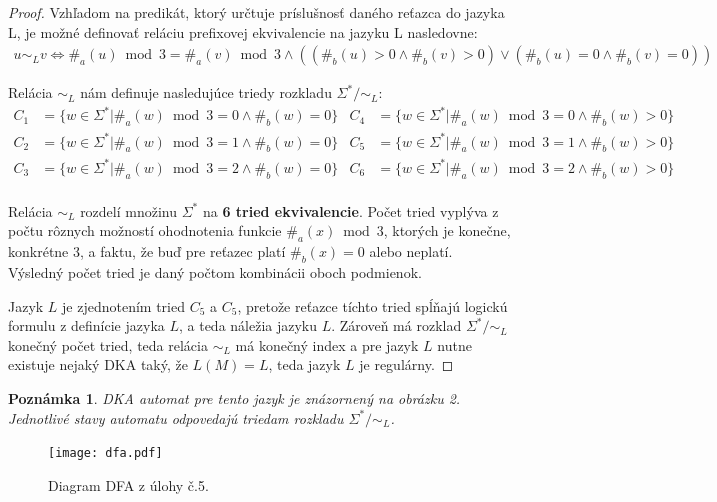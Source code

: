 \documentclass[10pt]{article}
\begin{document}
\begin{proof}
Vzhľadom na predikát, ktorý určtuje príslušnosť daného reťazca do jazyka L, je možné definovať
    reláciu prefixovej ekvivalencie na jazyku L nasledovne:
\begin{align*}
u \sim_L v \iff \#_a(u)\bmod 3 = \#_a(v)\bmod 3 \land ((\#_b(u) > 0 \land \#_b(v) > 0) \lor (\#_b(u) = 0 \land
\#_b(v) = 0))
\end{align*}

Relácia $\sim_L$ nám definuje nasledujúce triedy rozkladu $\Sigma^* / \sim_L$:
\begin{align*}
    C_1 &= \{ w \in \Sigma^* | \#_a(w) \bmod 3 = 0 \land \#_b(w) = 0 \} & C_4 &= \{ w \in \Sigma^* | \#_a(w) \bmod 3 = 0 \land \#_b(w) > 0 \} \\
    C_2 &= \{ w \in \Sigma^* | \#_a(w) \bmod 3 = 1 \land \#_b(w) = 0 \} & C_5 &= \{ w \in \Sigma^* | \#_a(w) \bmod 3 = 1 \land \#_b(w) > 0 \} \\
    C_3 &= \{ w \in \Sigma^* | \#_a(w) \bmod 3 = 2 \land \#_b(w) = 0 \} & C_6 &= \{ w \in \Sigma^* | \#_a(w) \bmod 3 = 2 \land \#_b(w) > 0 \} \\
\end{align*}

Relácia $\sim_L$ rozdelí množinu $\Sigma^*$ na \textbf{6 tried ekvivalencie}. Počet tried vyplýva z
    počtu rôznych možností ohodnotenia funkcie $\#_a(x) \bmod 3$, ktorých je konečne, konkrétne 3, a faktu, že buď pre reťazec
    platí $\#_b(x) = 0$ alebo neplatí. Výsledný počet tried je daný počtom kombinácii oboch
    podmienok.   

Jazyk $L$ je zjednotením tried $C_5$ a $C_5$, pretože reťazce tíchto tried spĺňajú logickú formulu
z definície jazyka $L$, a teda náležia jazyku $L$. Zároveň má rozklad $\Sigma^* / \sim_L$ konečný
počet tried, teda relácia $\sim_L$ má konečný index a pre jazyk $L$ nutne existuje nejaký DKA taký,
že $L(M) = L$, teda jazyk $L$ je regulárny. 
\end{proof}
\newtheorem*{remark}{Poznámka}
\begin{remark}
DKA automat pre tento jazyk je znázornený na obrázku 2. Jednotlivé stavy automatu odpovedajú
    triedam rozkladu $\Sigma^* / \sim_L$.
\end{remark}
\begin{figure}[h!]
    \label{automata}
    \centering
    \texttt{[image: dfa.pdf]}
    \caption{Diagram DFA z úlohy č.5.}
\end{figure}
\end{document}

